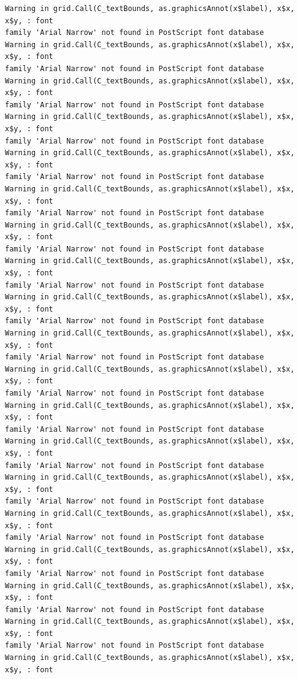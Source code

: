 \documentclass[
  letterpaper,
  DIV=11,
  numbers=noendperiod]{scrartcl}
\begin{document}
\begin{verbatim}
Warning in grid.Call(C_textBounds, as.graphicsAnnot(x$label), x$x, x$y, : font
family 'Arial Narrow' not found in PostScript font database
Warning in grid.Call(C_textBounds, as.graphicsAnnot(x$label), x$x, x$y, : font
family 'Arial Narrow' not found in PostScript font database
Warning in grid.Call(C_textBounds, as.graphicsAnnot(x$label), x$x, x$y, : font
family 'Arial Narrow' not found in PostScript font database
Warning in grid.Call(C_textBounds, as.graphicsAnnot(x$label), x$x, x$y, : font
family 'Arial Narrow' not found in PostScript font database
Warning in grid.Call(C_textBounds, as.graphicsAnnot(x$label), x$x, x$y, : font
family 'Arial Narrow' not found in PostScript font database
Warning in grid.Call(C_textBounds, as.graphicsAnnot(x$label), x$x, x$y, : font
family 'Arial Narrow' not found in PostScript font database
Warning in grid.Call(C_textBounds, as.graphicsAnnot(x$label), x$x, x$y, : font
family 'Arial Narrow' not found in PostScript font database
Warning in grid.Call(C_textBounds, as.graphicsAnnot(x$label), x$x, x$y, : font
family 'Arial Narrow' not found in PostScript font database
Warning in grid.Call(C_textBounds, as.graphicsAnnot(x$label), x$x, x$y, : font
family 'Arial Narrow' not found in PostScript font database
Warning in grid.Call(C_textBounds, as.graphicsAnnot(x$label), x$x, x$y, : font
family 'Arial Narrow' not found in PostScript font database
Warning in grid.Call(C_textBounds, as.graphicsAnnot(x$label), x$x, x$y, : font
family 'Arial Narrow' not found in PostScript font database
Warning in grid.Call(C_textBounds, as.graphicsAnnot(x$label), x$x, x$y, : font
family 'Arial Narrow' not found in PostScript font database
Warning in grid.Call(C_textBounds, as.graphicsAnnot(x$label), x$x, x$y, : font
family 'Arial Narrow' not found in PostScript font database
Warning in grid.Call(C_textBounds, as.graphicsAnnot(x$label), x$x, x$y, : font
family 'Arial Narrow' not found in PostScript font database
Warning in grid.Call(C_textBounds, as.graphicsAnnot(x$label), x$x, x$y, : font
family 'Arial Narrow' not found in PostScript font database
Warning in grid.Call(C_textBounds, as.graphicsAnnot(x$label), x$x, x$y, : font
family 'Arial Narrow' not found in PostScript font database
Warning in grid.Call(C_textBounds, as.graphicsAnnot(x$label), x$x, x$y, : font
family 'Arial Narrow' not found in PostScript font database
Warning in grid.Call(C_textBounds, as.graphicsAnnot(x$label), x$x, x$y, : font
family 'Arial Narrow' not found in PostScript font database
Warning in grid.Call(C_textBounds, as.graphicsAnnot(x$label), x$x, x$y, : font

\end{verbatim}
\end{document}
